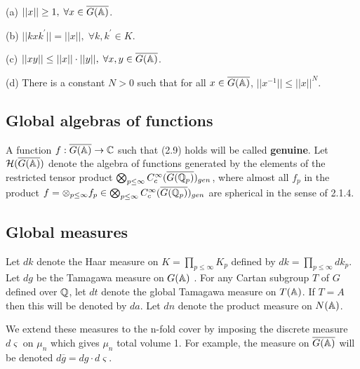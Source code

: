 \begin{lemma}
(a) $||x||\geq 1,\;\forall x\in \overline{G({\Bbb{A}})}$.

(b) $||kxk^{\prime }||=||x||,\;\forall k,k^{\prime }\in K$.

(c) $||xy||\leq ||x||\cdot ||y||,\;\forall x,y\in \overline{G({\Bbb{A}})}$.

(d) There is a constant $N>0$ such that for all
$x\in \overline{G({\Bbb{A}})}$,
$||x^{-1}||\leq ||x||^N$.
\end{lemma}

\subsection{Global algebras of functions}

A function $f:\overline{G({\Bbb{A}})}\rightarrow {\Bbb{C}}$
such that (2.9)
holds will be called \textbf{genuine}. Let 
${\cal{H}}(\overline{G({\Bbb{A}})})$ denote the algebra of 
functions generated by the elements of the
restricted tensor product 
$\bigotimes_{p\leq \infty }
C_c^\infty (\overline{G({\Bbb{Q}}_p)})_{gen}$, 
where almost all $f_p$ in the product 
$f=\otimes _{p\leq \infty}f_p\in 
\bigotimes_{p\leq \infty }C_c^\infty (\overline{G({\Bbb{Q}}_p)})_{gen}$ are
spherical in the sense of 2.1.4.

\subsection{Global measures}

Let $dk$ denote the Haar measure on $K=\prod_{p\leq \infty }K_p$
defined by $dk=\prod_{p\leq \infty }dk_p$.
Let $dg$ be the Tamagawa measure on
$G({\Bbb{A}})$ \cite{W2}. For any Cartan subgroup
$T$ of $G$ defined over ${\Bbb{Q}}$, let $dt$
denote the global Tamagawa measure on
$T({\Bbb{A}})$. If $T=A$ then this will
be denoted by $da$. Let $dn$ denote the product measure on $N({\Bbb{A}})$.

We extend these measures to the n-fold cover by imposing the discrete
measure $d\varsigma $ on $\mu _n$ which gives $\mu _n$ total volume 1. For
example, the measure on $\overline{G({\Bbb{A}})}$ will be denoted
$d\overline{g}=dg\cdot d\varsigma $.



